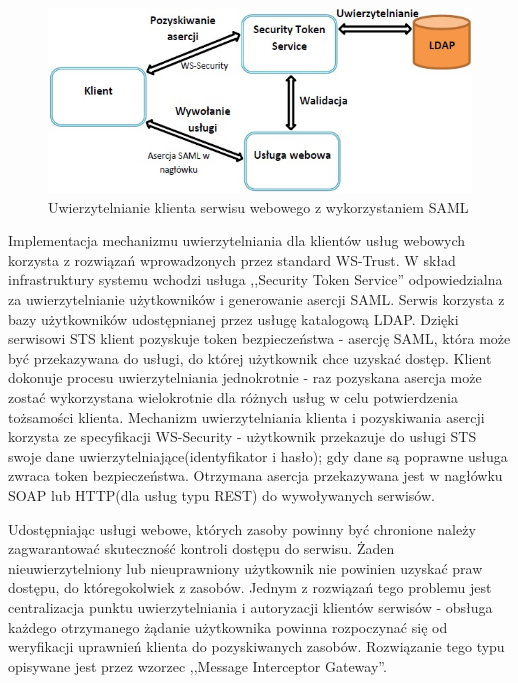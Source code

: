 		\begin{figure}[h]
			\centering
			\includegraphics{img/samlWS.jpg}
			\caption{Uwierzytelnianie klienta serwisu webowego z wykorzystaniem SAML}
			\label{Uwierzytelnianie klienta serwisu webowego z wykorzystaniem SAML}
		\end{figure}

		Implementacja mechanizmu uwierzytelniania dla klientów usług webowych korzysta z rozwiązań wprowadzonych przez standard WS-Trust. W skład infrastruktury systemu wchodzi usługa ,,Security Token Service'' odpowiedzialna za uwierzytelnianie użytkowników i generowanie asercji SAML. Serwis korzysta z bazy użytkowników udostępnianej przez usługę katalogową LDAP. Dzięki serwisowi STS klient pozyskuje token bezpieczeństwa - asercję SAML, która może być przekazywana do usługi, do której użytkownik chce uzyskać dostęp. Klient dokonuje procesu uwierzytelniania jednokrotnie - raz pozyskana asercja może zostać wykorzystana wielokrotnie dla różnych usług w celu potwierdzenia tożsamości klienta. Mechanizm uwierzytelniania klienta i pozyskiwania asercji korzysta ze specyfikacji WS-Security - użytkownik przekazuje do usługi STS swoje dane uwierzytelniające(identyfikator i hasło); gdy dane są poprawne usługa zwraca token bezpieczeństwa. Otrzymana asercja przekazywana jest w nagłówku SOAP lub HTTP(dla usług typu REST) do wywoływanych serwisów.

		Udostępniając usługi webowe, których zasoby powinny być chronione należy zagwarantować skuteczność kontroli dostępu do serwisu. Żaden nieuwierzytelniony lub nieuprawniony użytkownik nie powinien uzyskać praw dostępu, do któregokolwiek z zasobów. Jednym z rozwiązań tego problemu jest centralizacja punktu uwierzytelniania i autoryzacji klientów serwisów - obsługa każdego otrzymanego żądanie użytkownika powinna rozpoczynać się od weryfikacji uprawnień klienta do pozyskiwanych zasobów. Rozwiązanie tego typu opisywane jest przez wzorzec ,,Message Interceptor Gateway''. 

